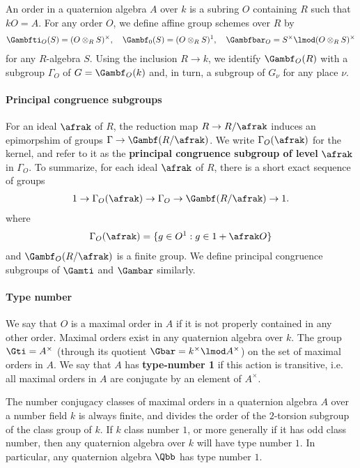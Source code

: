 An order in a quaternion algebra $A$ over $k$ is a subring $O$ containing $R$ such that $kO = A$. For any order $O$, we define affine group schemes over $R$ by
\begin{align*}
    \Gambfti_O(S) = (O\otimes_R S)^\times, \quad \Gambf_0(S) = (O\otimes_R S)^1, \quad \Gambfbar_O = S^\times \lmod (O\otimes_R S)^\times
\end{align*}
for any $R$-algebra $S$. Using the inclusion $R \to k$, we identify $\Gambf_O(R)$ with a subgroup $\Gamma_O$ of $G=\Gambf_O(k)$ and, in turn, a subgroup of $G_\nu$ for any place $\nu$.






\paragraph{Principal congruence subgroups}
For an ideal $\afrak$ of $R$, the reduction map $R \to R/\afrak$ induces an epimorpshim of groups $\Gamma \to \Gambf (R/\afrak)$. We write $\Gamma_O(\afrak)$ for the kernel, and refer to it as the \textbf{principal congruence subgroup of level } $\afrak$ in $\Gamma_O$. To summarize, for each ideal $\afrak$ of $R$, there is a short exact sequence of groups
\begin{align*}
    1 \to \Gamma_O (\afrak) \to \Gamma_O \to \Gambf (R/\afrak) \to 1.
\end{align*}
where
\begin{align*}
    \Gamma_O(\afrak) = \{ g \in O^1: g \in 1 + \afrak O\}
\end{align*}
and $\Gambf_O (R/\afrak)$ is a finite group. We define principal congruence subgroups of  $\Gamti$ and $\Gambar$ similarly.

\paragraph{Type number}
We say that $O$ is a maximal order in $A$ if it is not properly contained in any other order. Maximal orders exist in any quaternion algebra over $k$. The group $\Gti = A^\times$ (through its quotient $\Gbar = k^\times \lmod A^\times$) on the set of maximal orders in $A$. We say that $A$ has  \textbf{type-number 1} if this action is transitive, i.e. all maximal orders in $A$ are conjugate by an element of $A^\times$.
\begin{remark}\label{remark:classnum}
    The number conjugacy classes of maximal orders in a quaternion algebra $A$ over a number field $k$ is always finite, and divides the order of the $2$-torsion subgroup of the class group of $k$. If $k$ class number $1$, or more generally if it has odd class number, then any quaternion algebra over $k$ will have type number $1$.  In particular, any quaternion algebra $\Qbb$ has type number $1$.
\end{remark}



